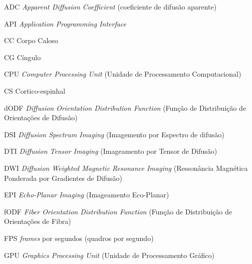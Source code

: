 \documentclass[
    12pt,                %
    oneside,            %
    a4paper,            %
    english,            %
    french,                %
    spanish,            %
    brazil                %
    ]{abntex2}
\begin{document}
\listoffigures*
\cleardoublepage

\listoftables*
\cleardoublepage

\begin{siglas}


\item[ADC] \textit{Apparent Diffusion Coefficient} (coeficiente de difusão aparente)

\item[API] \textit{Application Programming
Interface}

\item[CC] Corpo Caloso

\item[CG] Cíngulo

\item [CPU] \textit{Computer Processing Unit} (Unidade de Processamento Computacional)

\item[CS] Cortico-espinhal


\item[dODF] \textit{Diffusion Orientation Distribution Function} (Função de Distribuição de Orientações de Difusão)

\item[DSI] \textit{Diffusion Spectrum Imaging} (Imagemento por Espectro de difusão)

\item[DTI] \textit{Diffusion Tensor Imaging} (Imageamento por Tensor de Difusão)

\item[DWI] \textit{Diffusion Weighted Magnetic Resonance Imaging} (Ressonância Magnética Ponderada por Gradientes de Difusão)

\item[EPI] \textit{Echo-Planar Imaging} (Imageamento Eco-Planar)

\item[fODF] \textit{Fiber Orientation Distribution Function} (Função de Distribuição de Orientações de Fibra)

\item[FPS] \textit{frames} por segundos (quadros por segundo)

\item [GPU] \textit{Graphics Processing Unit} (Unidade de Processamento Gráfico)


\end{siglas}
\end{document}
